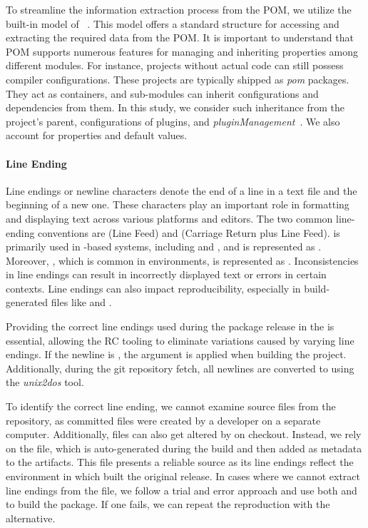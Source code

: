 \documentclass[smallextended]{svjour3}
\newcommand{\maven}[1]{\tool{Maven{#1}}}
\newcommand{\java}{\tool{Java}}
\begin{document}
To streamline the information extraction process from the POM, we utilize the built-in model of \maven{}~\cite{mavenModel}. This model offers a standard structure for accessing and extracting the required data from the POM. It is important to understand that POM supports numerous features for managing and inheriting properties among different modules. For instance, projects without actual \java{} code can still possess compiler configurations. These projects are typically shipped as \emph{pom} packages. They act as containers, and sub-modules can inherit configurations and dependencies from them. In this study, we consider such inheritance from the project's parent, configurations of plugins, and \emph{pluginManagement}~\cite{pluginManagement}. We also account for properties and \maven{} default values.

\paragraph{Line Ending}
Line endings or newline characters denote the end of a line in a text file and the beginning of a new one. These characters play an important role in formatting and displaying text across various platforms and editors. The two common line-ending conventions are  (Line Feed) and  (Carriage Return plus Line Feed).  is primarily used in -based systems, including  and , and is represented as . Moreover, , which is common in  environments, is represented as . Inconsistencies in line endings can result in incorrectly displayed text or errors in certain contexts. Line endings can also impact reproducibility, especially in build-generated files like  and .

Providing the correct line endings used during the package release in the  is essential, allowing the RC tooling to eliminate variations caused by varying line endings. If the newline is , the argument  is applied when building the project. Additionally, during the git repository fetch, all newlines are converted to  using the \textit{unix2dos} tool.

To identify the correct line ending, we cannot examine source files from the repository, as committed files were created by a developer on a separate computer. Additionally, files can also get altered by  on checkout. Instead, we rely on the  file, which is auto-generated %
during the build and then added as metadata to the artifacts. This file presents a reliable source as its line endings reflect the environment in which \maven{} built the original release. In cases where we cannot extract line endings from the file, we follow a trial and error approach and use both  and  to build the package. If one fails, we can repeat the reproduction with the alternative.
\end{document}
